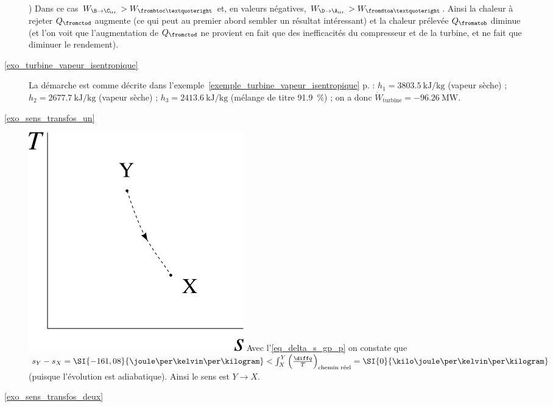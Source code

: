 \begin{description}
						) Dans ce cas $W_{\B\to\C_\text{irr.}} > W_{\frombtoc’}$ et, en valeurs négatives, $W_{\D\to\A_\text{irr.}} > W_{\fromdtoa’}$. Ainsi la chaleur à rejeter $Q_{\fromctod}$ augmente (ce qui peut au premier abord sembler un résultat intéressant) et la chaleur prélevée $Q_{\fromatob}$ diminue (et l’on voit que l’augmentation de $Q_{\fromctod}$ ne provient en fait que des inefficacités du compresseur et de la turbine, et ne fait que diminuer le rendement).
		\item [\ref{exo_turbine_vapeur_isentropique}]
						\tab La démarche est comme décrite dans l’exemple~\ref{exemple_turbine_vapeur_isentropique} p.\pageref{exemple_turbine_vapeur_isentropique} : $h_1 = \SI{3803,5}{\kilo\joule\per\kilogram}$ (vapeur sèche) ; $h_2 = \SI{2677,7}{\kilo\joule\per\kilogram}$ (vapeur sèche) ; $h_3 = \SI{2413,6}{\kilo\joule\per\kilogram}$ (mélange de titre \SI{91,9}{\percent}) ; on a donc $\dot{W}_\text{turbine} = \SI{-96,26}{\mega\watt}$.
		\item [\ref{exo_sens_transfos_un}]
						\includegraphics[width=\solutiondiagramwidth]{images/exo_sol_ts_bonsens1.png}
						\tab\tab Avec l’\cref{eq_delta_s_gp_p} on constate que $s_Y - s_X = \SI{-161,08}{\joule\per\kelvin\per\kilogram} < \int_X^Y \left(\frac{\diff q}{T}\right)_\text{chemin réel} = \SI{0}{\kilo\joule\per\kelvin\per\kilogram}$ (puisque l’évolution est adiabatique). Ainsi le sens est $Y\to X$.
		\item [\ref{exo_sens_transfos_deux}]

\end{description}

